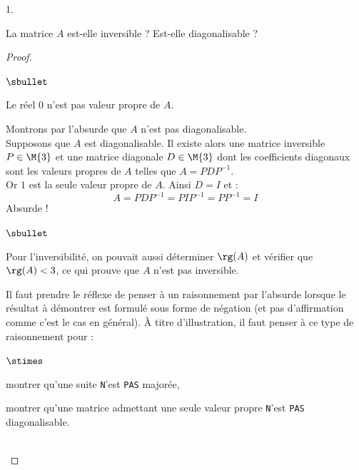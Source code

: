\begin{noliste}{1.}
\item La matrice $A$ est-elle inversible ? Est-elle diagonalisable ?

  \begin{proof}~
    \begin{noliste}{$\sbullet$}
    \item Le réel $0$ n'est pas valeur propre de $A$.
    \item Montrons par l'absurde que $A$ n'est pas diagonalisable.\\
      Supposons que $A$ est diagonalisable. Il existe alors une
      matrice inversible $P \in \M{3}$ et une matrice diagonale $D \in
      \M{3}$ dont les coefficients diagonaux sont les valeurs propres
      de $A$ telles que $A=PDP^{-1}$.\\
      Or $1$ est la seule valeur propre de $A$. Ainsi $D = I$ et :
      \[
      A = PDP^{-1} = PIP^{-1} = PP^{-1} = I
      \]
      Absurde !%
    \end{noliste}
    \begin{remark}
      \begin{noliste}{$\sbullet$}
      \item Pour l'inversibilité, on pouvait aussi déterminer $\rg(A)$ et
        vérifier que $\rg(A)<3$, ce qui prouve que $A$ n'est pas
        inversible.
        
      \item Il faut prendre le réflexe de penser à un raisonnement par
        l'absurde lorsque le résultat à démontrer est formulé sous forme
        de négation (et pas d'affirmation comme c'est le cas en
        général). À titre d'illustration, il faut penser à ce type de
        raisonnement pour :
        \begin{noliste}{$\stimes$}
        \item montrer qu'une suite {\tt N}'est {\tt PAS} majorée,
        \item montrer qu'une matrice admettant une seule valeur propre
          {\tt N}'est {\tt PAS} diagonalisable.
        \end{noliste}
      \end{noliste}
    \end{remark}~\\[-1.4cm]
  \end{proof}
\end{noliste}



